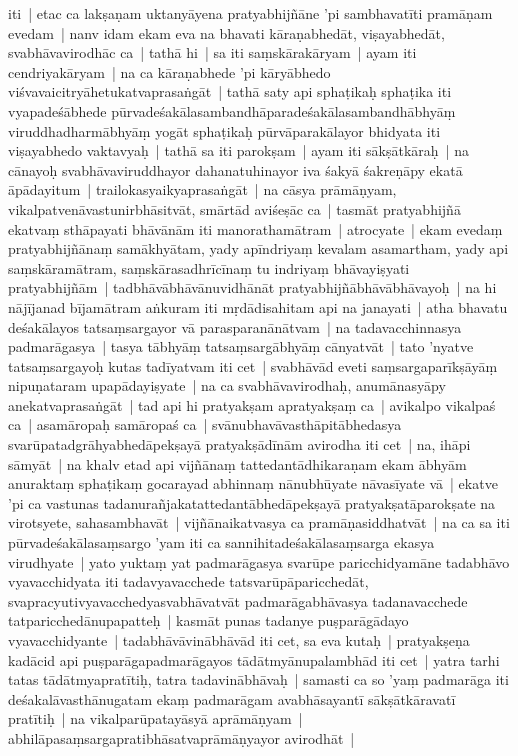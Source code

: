 \documentclass[article,12pt,a4paper]{memoir}
\begin{document}
	  \pstart iti | etac ca lakṣaṇam uktanyāyena pratyabhijñāne 'pi sambhavatīti pramāṇam evedam | \label{thakur75-113.14} nanv idam ekam eva na bhavati kāraṇabhedāt, viṣayabhedāt, svabhāvavirodhāc ca | \label{thakur75-113.14a} tathā hi | sa iti saṃskārakāryam | ayam iti cendriyakāryam | na ca kāraṇabhede 'pi kāryābhedo viśvavaicitryāhetukatvaprasaṅgāt | \label{thakur75-113.16} tathā saty api sphaṭikaḥ sphaṭika iti vyapadeśābhede pūrvadeśakālasambandhāparadeśakālasambandhābhyāṃ viruddhadharmābhyāṃ yogāt sphaṭikaḥ pūrvāparakālayor bhidyata iti viṣayabhedo vaktavyaḥ | \label{thakur75-113.18} tathā sa iti parokṣam | ayam iti sākṣātkāraḥ | na cānayoḥ svabhāvaviruddhayor dahanatuhinayor iva śakyā śakreṇāpy ekatā āpādayitum | trailokasyaikyaprasaṅgāt | \label{thakur75-113.20} na cāsya prāmāṇyam, vikalpatvenāvastunirbhāsitvāt, smārtād aviśeṣāc ca | tasmāt pratyabhijñā ekatvaṃ sthāpayati bhāvānām iti manorathamātram | \label{thakur75-113.23} atrocyate | ekam evedaṃ pratyabhijñānaṃ samākhyātam, \label{thakur75-113.23a} yady apīndriyaṃ kevalam asamartham, yady api saṃskāramātram, saṃskārasadhrīcīnaṃ tu indriyaṃ bhāvayiṣyati pratyabhijñām | tadbhāvābhāvānuvidhānāt pratyabhijñābhāvābhāvayoḥ | na hi nājījanad bījamātram aṅkuram iti mṛdādisahitam api na janayati | \label{thakur75-113.26} atha bhavatu deśakālayos tatsaṃsargayor vā parasparanānātvam | na tadavacchinnasya padmarāgasya | tasya tābhyāṃ tatsaṃsargābhyāṃ cānyatvāt | \label{thakur75-113.29} tato 'nyatve tatsaṃsargayoḥ kutas tadīyatvam iti cet | svabhāvād eveti saṃsargaparīkṣāyāṃ nipuṇataram upapādayiṣyate | \label{thakur75-113.30} na ca svabhāvavirodhaḥ, anumānasyāpy anekatvaprasaṅgāt | tad api hi pratyakṣam apratyakṣaṃ ca | avikalpo vikalpaś ca | asamāropaḥ samāropaś ca | \label{thakur75-113.32} svānubhavāvasthāpitābhedasya svarūpatadgrāhyabhedāpekṣayā pratyakṣādīnām avirodha iti cet | na, ihāpi sāmyāt | na khalv etad api vijñānaṃ tattedantādhikaraṇam ekam ābhyām anuraktaṃ sphaṭikaṃ gocarayad abhinnaṃ nānubhūyate nāvasīyate vā | ekatve 'pi ca vastunas tadanurañjakatattedantābhedāpekṣayā pratyakṣatāparokṣate na virotsyete, sahasambhavāt | vijñānaikatvasya ca pramāṇasiddhatvāt | \label{thakur75-114.3} na ca sa iti pūrvadeśakālasaṃsargo 'yam iti ca sannihitadeśakālasaṃsarga ekasya virudhyate | yato yuktaṃ yat padmarāgasya svarūpe paricchidyamāne tadabhāvo vyavacchidyata iti tadavyavacchede tatsvarūpāparicchedāt, svapracyutivyavacchedyasvabhāvatvāt padmarāgabhāvasya tadanavacchede tatparicchedānupapatteḥ | \label{thakur75-114.8} kasmāt punas tadanye puṣparāgādayo vyavacchidyante | tadabhāvāvinābhāvād iti cet, sa eva kutaḥ | pratyakṣeṇa kadācid api puṣparāgapadmarāgayos tādātmyānupalambhād iti cet | yatra tarhi tatas tādātmyapratītiḥ, tatra tadavinābhāvaḥ | samasti ca so 'yaṃ padmarāga iti deśakalāvasthānugatam ekaṃ padmarāgam avabhāsayantī sākṣātkāravatī pratītiḥ | \label{thakur75-114.12} na vikalparūpatayāsyā aprāmāṇyam | abhilāpasaṃsargapratibhāsatvaprāmāṇyayor avirodhāt | 
\end{document}
